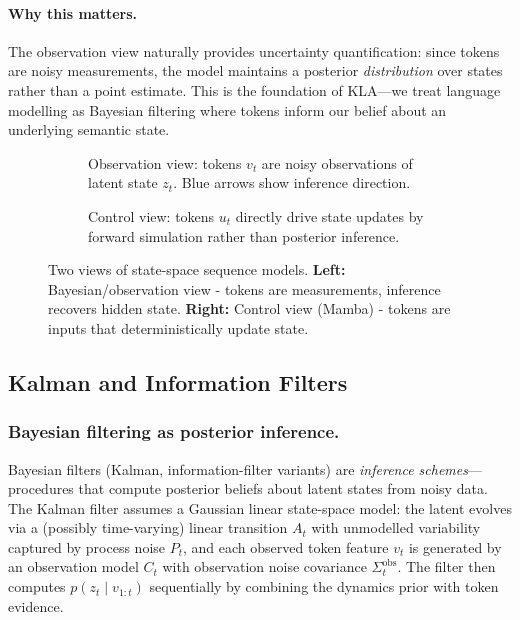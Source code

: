 \documentclass{article}
\newcommand{\our}{\textsc{KLA}\xspace}
\begin{document}
\paragraph{Why this matters.}
The observation view naturally provides uncertainty quantification: since tokens are noisy measurements, the model maintains a posterior \emph{distribution} over states rather than a point estimate.
This is the foundation of \our---we treat language modelling as Bayesian filtering where tokens inform our belief about an underlying semantic state.

\begin{figure}[h]
\centering
\begin{subfigure}[t]{0.48\textwidth}
\centering
\resizebox{\linewidth}{!}{\tikzBGSS}
\caption{Observation view: tokens $v_t$ are noisy observations of latent state $z_t$. Blue arrows show inference direction.}
\end{subfigure}
\hfill
\begin{subfigure}[t]{0.48\textwidth}
\centering
\resizebox{\linewidth}{!}{\tikzMambaSSM}
\caption{Control view: tokens $u_t$ directly drive state updates by forward simulation rather than posterior inference.}
\end{subfigure}
\caption{Two views of state-space sequence models. \textbf{Left:} Bayesian/observation view - tokens are measurements, inference recovers hidden state. \textbf{Right:} Control view (Mamba) - tokens are inputs that deterministically update state.}
\label{fig:control-obs-view}
\end{figure}

\subsection{Kalman and Information Filters}
\label{app:primer-nlp-kf}

\subsubsection{Bayesian filtering as posterior inference.}

Bayesian filters (Kalman, information-filter variants) are \emph{inference schemes}---procedures that compute
posterior beliefs about latent states from noisy data.
The Kalman filter assumes a Gaussian linear state-space model:
the latent evolves via a (possibly time-varying) linear transition \(A_t\) with unmodelled variability captured by process noise \(P_t\),
and each observed token feature \(v_t\) is generated by an observation model \(C_t\) with observation noise covariance \(\Sigma^{\mathrm{obs}}_t\).
The filter then computes \(p(z_t\mid v_{1:t})\) sequentially by combining the dynamics prior with token evidence.
\end{document}
